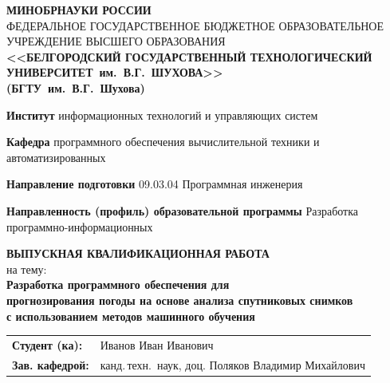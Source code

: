 \documentclass[14pt]{extarticle}
\begin{document}
\newpage
\begin{titlepage}
\begin{center}
	\small
	\textbf{МИНОБРНАУКИ РОССИИ} \\[0.5em]
	ФЕДЕРАЛЬНОЕ ГОСУДАРСТВЕННОЕ БЮДЖЕТНОЕ ОБРАЗОВАТЕЛЬНОЕ УЧРЕЖДЕНИЕ 
	ВЫСШЕГО ОБРАЗОВАНИЯ \\[0.3em]
	\textbf{<<БЕЛГОРОДСКИЙ ГОСУДАРСТВЕННЫЙ ТЕХНОЛОГИЧЕСКИЙ\\УНИВЕРСИТЕТ~им.~В.Г.~ШУХОВА>>}\\
	\textbf{(БГТУ~им.~В.Г.~Шухова)}
\end{center}
\vspace{1em}
\begin{list}{}{\setlength{\leftmargin}{0cm}\setlength{\parsep}{1pt}}
	\small\sloppy
	\item\textbf{Институт} информационных технологий и управляющих систем
	\item\textbf{Кафедра} программного обеспечения вычислительной техники и автоматизированных 
	\item\textbf{Направление подготовки} 09.03.04 Программная инженерия
	\item\textbf{Направленность (профиль) образовательной программы} Разработка программно-информационных 
\end{list}
\vspace{0.5cm}	
\begin{center}
\textbf{ВЫПУСКНАЯ КВАЛИФИКАЦИОННАЯ РАБОТА} \\[0em]
на тему: \\[1em]
\textbf{Разработка программного обеспечения для\\прогнозирования погоды на основе анализа спутниковых снимков\\с использованием методов машинного обучения} 
\end{center}
\vfill
\begin{flushleft}
	\small
	\begin{tabular}{@{}l l@{}}
		\hspace{0cm}\textbf{Студент (ка):}    & Иванов Иван Иванович \\
		\hspace{0cm}\textbf{Зав. кафедрой:}   & канд.\,техн.\ наук, доц. Поляков Владимир Михайлович \\

\end{tabular}
\end{flushleft}
\end{titlepage}
\end{document}
